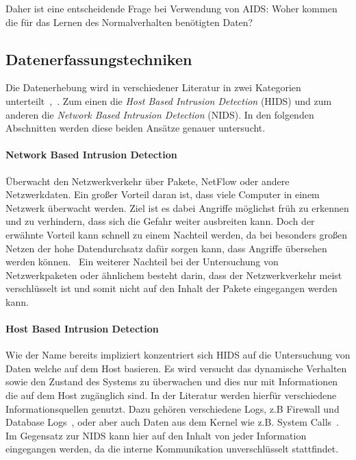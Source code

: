                 Daher ist eine entscheidende Frage bei Verwendung von AIDS\@: Woher kommen die für das Lernen des Normalverhalten benötigten Daten?

        \subsection{Datenerfassungstechniken}
        \label{sec:Datentechnik}

            Die Datenerhebung wird in verschiedener Literatur in zwei Kategorien unterteilt~\cite{IDSsurvey},~\cite{IDSreview}.
            Zum einen die \textit{Host Based Intrusion Detection} (HIDS) und zum anderen die \textit{Network Based Intrusion Detection} (NIDS).
            In den folgenden Abschnitten werden diese beiden Ansätze genauer untersucht.

            \paragraph{Network Based Intrusion Detection}
                Überwacht den Netzwerkverkehr über Pakete, NetFlow oder andere Netzwerkdaten.
                Ein großer Vorteil daran ist, dass viele Computer in einem Netzwerk überwacht werden.
                Ziel ist es dabei Angriffe möglichst früh zu erkennen und zu verhindern, dass sich die Gefahr weiter ausbreiten kann.
                Doch der erwähnte Vorteil kann schnell zu einem Nachteil werden,
                da bei besonders großen Netzen der hohe Datendurchsatz dafür sorgen kann, dass Angriffe übersehen werden können.~\cite{NIDS}
                Ein weiterer Nachteil bei der Untersuchung von Netzwerkpaketen oder ähnlichem besteht darin, dass der Netzwerkverkehr meist verschlüsselt ist
                und somit nicht auf den Inhalt der Pakete eingegangen werden kann.

            \paragraph{Host Based Intrusion Detection}
                Wie der Name bereits impliziert konzentriert sich HIDS auf die Untersuchung von Daten welche auf dem Host basieren.
                Es wird versucht das dynamische Verhalten sowie den Zustand des Systems zu überwachen und dies nur mit Informationen die auf dem Host zugänglich sind.
                In der Literatur werden hierfür verschiedene Informationsquellen genutzt.
                Dazu gehören verschiedene Logs, z.B Firewall und Database Logs~\cite{IDSsurvey}, oder aber auch Daten aus dem Kernel wie z.B. System Calls~\cite{MAGGI}.
                Im Gegensatz zur NIDS kann hier auf den Inhalt von jeder Information eingegangen werden, da die interne Kommunikation unverschlüsselt stattfindet. 

